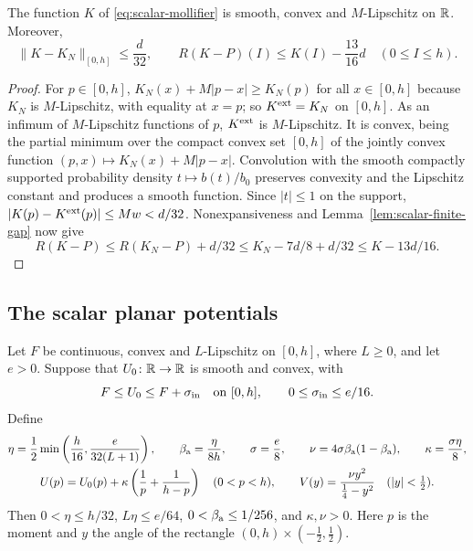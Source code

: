 \begin{proposition}\label{prop:scalar-cmp-gap}
The function $K$ of \eqref{eq:scalar-mollifier} is smooth, convex and $M$-Lipschitz on $\mathbb{R}$. Moreover,
\begin{equation}\label{eq:scalar-smooth-gap}
 \|K-K_N\|_{[0,h]}\le\frac d{32},\qquad
 R(K-P)(I)\le K(I)-\frac{13}{16}d\quad(0\le I\le h).
\end{equation}
{\normalfont {}}
\end{proposition}

\begin{proof}
For $p\in[0,h]$, $K_N(x)+M|p-x|\ge K_N(p)$ for all $x\in[0,h]$ because $K_N$ is $M$-Lipschitz, with equality at
$x=p$; so $K^{\rm ext}=K_N$ on $[0,h]$. As an infimum of $M$-Lipschitz functions of $p$, $K^{\rm ext}$ is $M$-Lipschitz.
It is convex, being the partial minimum over the compact convex set $[0,h]$ of the jointly convex function
$(p,x)\mapsto K_N(x)+M|p-x|$. Convolution with the smooth compactly supported probability density
$t\mapsto b(t)/b_0$ preserves convexity and the Lipschitz constant and produces a smooth function. Since $|t|\le1$ on
the support, $|K(p)-K^{\rm ext}(p)|\le Mw<d/32$. Nonexpansiveness and Lemma~\ref{lem:scalar-finite-gap} now give
\[
 R(K-P)\le R(K_N-P)+d/32\le K_N-7d/8+d/32\le K-13d/16.
\]
\end{proof}

\subsection{The scalar planar potentials}\label{sec:scalar-potentials}

Let $F$ be continuous, convex and $L$-Lipschitz on $[0,h]$, where $L\ge0$, and let $e>0$. Suppose that
$U_0\colon\mathbb{R}\to\mathbb{R}$ is smooth and convex, with
\begin{equation}\label{eq:scalar-majorant}
 F\le U_0\le F+\sigma_{\rm in}\quad\hbox{on }[0,h],\qquad 0\le\sigma_{\rm in}\le e/16.
\end{equation}
Define
\begin{gather}\label{eq:scalar-planar-constants}
 \eta=\frac12\min\left(\frac h{16},\frac{e}{32(L+1)}\right),\qquad
 \beta_{\rm a}=\frac{\eta}{8h},\qquad \sigma=\frac e8,\qquad
 \nu=4\sigma\beta_{\rm a}(1-\beta_{\rm a}),\qquad \kappa=\frac{\sigma\eta}{8},\\
 U(p)=U_0(p)+\kappa\left(\frac1p+\frac1{h-p}\right)\quad(0<p<h),\qquad
 V(y)=\frac{\nu y^2}{\frac14-y^2}\quad(|y|<\tfrac12).\notag
\end{gather}
Then $0<\eta\le h/32$, $L\eta\le e/64$, $0<\beta_{\rm a}\le1/256$, and $\kappa,\nu>0$. Here $p$ is the moment and $y$
the angle of the rectangle $(0,h)\times(-\frac12,\frac12)$.

